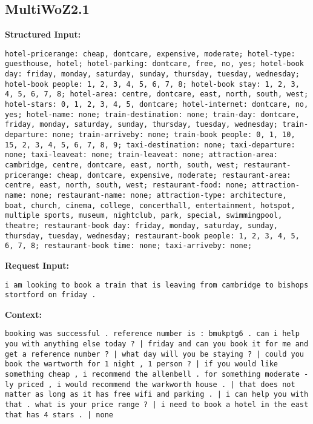 \documentclass[11pt]{article}
\begin{document}
\subsection{MultiWoZ2.1}
\textbf{Structured Input:} 
\begin{lstlisting}
hotel-pricerange: cheap, dontcare, expensive, moderate; hotel-type: guesthouse, hotel; hotel-parking: dontcare, free, no, yes; hotel-book day: friday, monday, saturday, sunday, thursday, tuesday, wednesday; hotel-book people: 1, 2, 3, 4, 5, 6, 7, 8; hotel-book stay: 1, 2, 3, 4, 5, 6, 7, 8; hotel-area: centre, dontcare, east, north, south, west; hotel-stars: 0, 1, 2, 3, 4, 5, dontcare; hotel-internet: dontcare, no, yes; hotel-name: none; train-destination: none; train-day: dontcare, friday, monday, saturday, sunday, thursday, tuesday, wednesday; train-departure: none; train-arriveby: none; train-book people: 0, 1, 10, 15, 2, 3, 4, 5, 6, 7, 8, 9; taxi-destination: none; taxi-departure: none; taxi-leaveat: none; train-leaveat: none; attraction-area: cambridge, centre, dontcare, east, north, south, west; restaurant-pricerange: cheap, dontcare, expensive, moderate; restaurant-area: centre, east, north, south, west; restaurant-food: none; attraction-name: none; restaurant-name: none; attraction-type: architecture, boat, church, cinema, college, concerthall, entertainment, hotspot, multiple sports, museum, nightclub, park, special, swimmingpool, theatre; restaurant-book day: friday, monday, saturday, sunday, thursday, tuesday, wednesday; restaurant-book people: 1, 2, 3, 4, 5, 6, 7, 8; restaurant-book time: none; taxi-arriveby: none; 
\end{lstlisting}
\textbf{Request Input:} 
\begin{lstlisting}
i am looking to book a train that is leaving from cambridge to bishops stortford on friday .
\end{lstlisting}
\textbf{Context:} \begin{lstlisting}
booking was successful . reference number is : bmukptg6 . can i help you with anything else today ? | friday and can you book it for me and get a reference number ? | what day will you be staying ? | could you book the wartworth for 1 night , 1 person ? | if you would like something cheap , i recommend the allenbell . for something moderate -ly priced , i would recommend the warkworth house . | that does not matter as long as it has free wifi and parking . | i can help you with that . what is your price range ? | i need to book a hotel in the east that has 4 stars . | none
\end{lstlisting}
\end{document}
